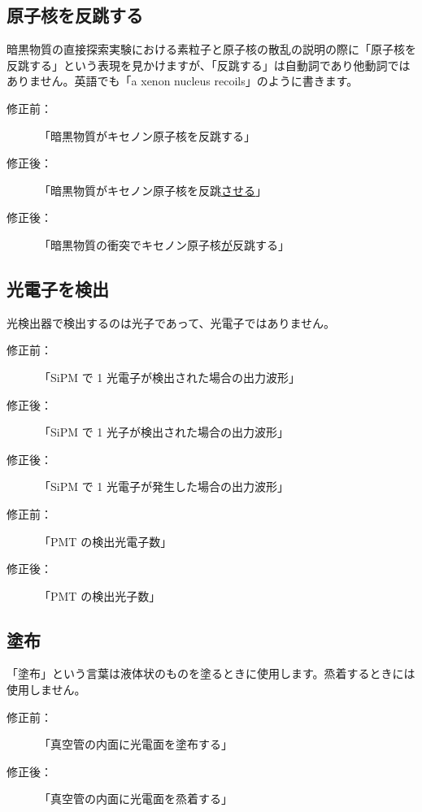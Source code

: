 \subsection{原子核を反跳する}

暗黒物質の直接探索実験における素粒子と原子核の散乱の説明の際に「原子核を反跳する」という表現を見かけますが、「反跳する」は自動詞であり他動詞ではありません。英語でも「a xenon nucleus recoils」のように書きます。

\begin{description}
\item[修正前：]「暗黒物質がキセノン原子核を反跳する」
\item[修正後：]「暗黒物質がキセノン原子核を反跳\underline{させる}」
\item[修正後：]「暗黒物質の衝突でキセノン原子核\underline{が}反跳する」
\end{description}

\subsection{光電子を検出}

光検出器で検出するのは光子であって、光電子ではありません。

\begin{description}
\item[修正前：]「SiPM で 1 光電子が検出された場合の出力波形」
\item[修正後：]「SiPM で 1 光子が検出された場合の出力波形」
\item[修正後：]「SiPM で 1 光電子が発生した場合の出力波形」
\end{description}

\begin{description}
\item[修正前：]「PMT の検出光電子数」
\item[修正後：]「PMT の検出光子数」
\end{description}

\subsection{塗布}

「塗布」という言葉は液体状のものを塗るときに使用します。烝着するときには使用しません。

\begin{description}
\item[修正前：]「真空管の内面に光電面を塗布する」
\item[修正後：]「真空管の内面に光電面を烝着する」
\end{description}

